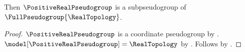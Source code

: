 \begin{classification}\label{positive_real_pseudogroup_in_full}
    Then $\PositiveRealPseudogroup$ is a subpseudogroup of $\FullPseudogroup{\RealTopology}$.
\end{classification}
\begin{proof}
    $\PositiveRealPseudogroup$ is a coordinate pseudogroup by .
    $\model[\PositiveRealPseudogroup]=\RealTopology$ by
        .
    Follows by .
\end{proof}
